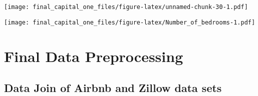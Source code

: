 \documentclass[
]{article}
\begin{document}
\texttt{[image: final\_capital\_one\_files/figure-latex/unnamed-chunk-30-1.pdf]}

\texttt{[image: final\_capital\_one\_files/figure-latex/Number\_of\_bedrooms-1.pdf]}

\hypertarget{final-data-preprocessing}{%
\section{Final Data Preprocessing}\label{final-data-preprocessing}}

\hypertarget{data-join-of-airbnb-and-zillow-data-sets}{%
\subsection{Data Join of Airbnb and Zillow data
sets}\label{data-join-of-airbnb-and-zillow-data-sets}}
\end{document}
